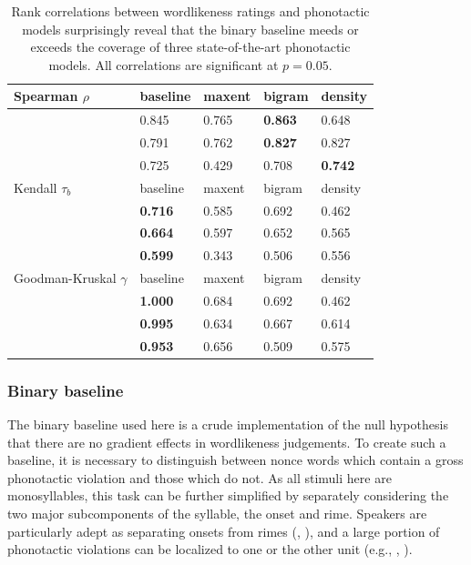 \begin{table} \centering
\begin{tabular}{l l l l l}
\toprule
Spearman $\rho$          & baseline         & maxent  & bigram           & density          \\
\midrule
\citealt{Greenberg1964}  & {0.845}          & {0.765} & {\textbf{0.863}} & {0.648}          \\
\citealt{Scholes1966}    & {0.791}          & {0.762} & {\textbf{0.827}} & {0.827}          \\
\citealt{Albright2003b}  & {0.725}          & {0.429} & {0.708}          & {\textbf{0.742}} \\
\midrule
Kendall $\tau_b$         & baseline         & maxent  & bigram           & density          \\
\midrule
\citealt{Greenberg1964}  & {\textbf{0.716}} & {0.585} & {0.692}          & {0.462}          \\
\citealt{Scholes1966}    & {\textbf{0.664}} & {0.597} & {0.652}          & {0.565}          \\
\citealt{Albright2003b}  & {\textbf{0.599}} & {0.343} & {0.506}          & {0.556}          \\
\midrule
Goodman-Kruskal $\gamma$ & baseline         & maxent  & bigram           & density          \\
\midrule
\citealt{Greenberg1964}  & {\textbf{1.000}} & {0.684} & {0.692}          & {0.462}          \\
\citealt{Scholes1966}    & {\textbf{0.995}} & {0.634} & {0.667}          & {0.614}          \\
\citealt{Albright2003b}  & {\textbf{0.953}} & {0.656} & {0.509}          & {0.575}          \\
\bottomrule
\end{tabular}
\caption{Rank correlations between wordlikeness ratings and phonotactic models surprisingly reveal that the binary baseline meeds or exceeds the coverage of three state-of-the-art phonotactic models. All correlations are significant at $p = 0.05$.}
\label{cor}
\end{table}

\subsubsection{Binary baseline}

The binary baseline used here is a crude implementation of the null hypothesis that there are no gradient effects in wordlikeness judgements. To create such a baseline, it is necessary to distinguish between nonce words which contain a gross phonotactic violation and those which do not. As all stimuli here are monosyllables, this task can be further simplified by separately considering the two major subcomponents of the syllable, the onset and rime. Speakers are particularly adept as separating onsets from rimes (\citealt{Treiman1986,Treiman1995}, \citealt{Fowler1993}), and a large portion of phonotactic violations can be localized to one or the other unit (e.g., \citealt{Fudge1969}, \citealt{Treiman2000}).

